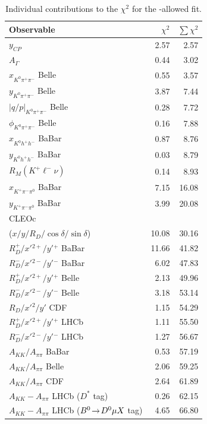 \begin{table}
\renewcommand{\arraystretch}{1.4}
\begin{center}
\caption{\label{tab:results_chi2}
Individual contributions to the $\chi^2$ for the \cpv-allowed fit.}
\vspace*{6pt}
\footnotesize
\begin{tabular}{l|rr}
\hline
\textbf{Observable} & \textbf{\boldmath $\chi^2$} & \textbf{\boldmath $\sum\chi^2$} \\
\hline
$y^{}_{CP}$                      & 2.57 & 2.57 \\
$A^{}_\Gamma$                    & 0.44 & 3.02 \\
\hline
$x^{}_{K^0\pi^+\pi^-}$ Belle       & 0.55 & 3.57 \\
$y^{}_{K^0\pi^+\pi^-}$ Belle       & 3.87 & 7.44 \\
$|q/p|^{}_{K^0\pi^+\pi^-}$ Belle   & 0.28 & 7.72 \\
$\phi^{}_{K^0\pi^+\pi^-}$  Belle   & 0.16 & 7.88 \\
\hline
$x^{}_{K^0 h^+ h^-}$ BaBar         & 0.87 & 8.76 \\
$y^{}_{K^0 h^+ h^-}$ BaBar         & 0.03 & 8.79 \\
\hline
$R^{}_M(K^+\ell^-\nu)$           & 0.14 & 8.93 \\
\hline
$x^{}_{K^+\pi^-\pi^0}$ BaBar       & 7.15 & 16.08 \\
$y^{}_{K^+\pi^-\pi^0}$ BaBar       & 3.99 & 20.08 \\
\hline
CLEOc                           &      &       \\
($x/y/R^{}_D/\cos\delta/\sin\delta$) 
                                & 10.08 & 30.16 \\
\hline
$R^+_D/x'{}^{2+}/y'{}^+$ BaBar   & 11.66 & 41.82    \\
$R^-_D/x'{}^{2-}/y'{}^-$ BaBar   &  6.02 & 47.83    \\
$R^+_D/x'{}^{2+}/y'{}^+$ Belle   &  2.13 & 49.96    \\
$R^-_D/x'{}^{2-}/y'{}^-$ Belle   &  3.18 & 53.14    \\
$R^{}_D/x'{}^{2}/y'$ CDF         &  1.15 & 54.29    \\
$R^+_D/x'{}^{2+}/y'{}^+$ LHCb    &  1.11 & 55.50    \\
$R^-_D/x'{}^{2-}/y'{}^-$ LHCb    &  1.27 & 56.67    \\
\hline
$A^{}_{KK}/A^{}_{\pi\pi}$  BaBar  & 0.53 & 57.19  \\
$A^{}_{KK}/A^{}_{\pi\pi}$  Belle  & 2.06 & 59.25  \\
$A^{}_{KK}/A^{}_{\pi\pi}$  CDF    & 2.64 & 61.89  \\
$A^{}_{KK}-A^{}_{\pi\pi}$  LHCb ($D^*$ tag)   
                                & 0.26 & 62.15  \\
$A^{}_{KK}-A^{}_{\pi\pi}$  LHCb ($B^0\!\rightarrow\! D^0\mu X$ tag)
                                & 4.65 & 66.80  \\
\hline
\end{tabular}
\end{center}
\end{table}

